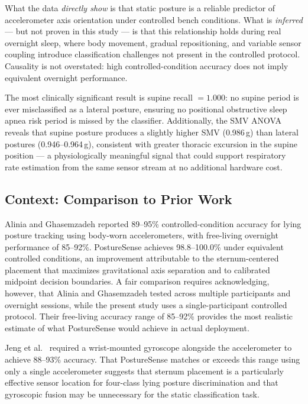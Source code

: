 \documentclass[conference]{IEEEtran}
\begin{document}
What the data \textit{directly show} is that static posture is a reliable predictor
of accelerometer axis orientation under controlled bench conditions.
What is \textit{inferred} --- but not proven in this study --- is that this
relationship holds during real overnight sleep, where body movement, gradual
repositioning, and variable sensor coupling introduce classification challenges not
present in the controlled protocol.
Causality is not overstated: high controlled-condition accuracy does not imply
equivalent overnight performance.

The most clinically significant result is supine recall $= 1.000$: no supine period
is ever misclassified as a lateral posture, ensuring no positional obstructive sleep
apnea risk period is missed by the classifier.
Additionally, the SMV ANOVA reveals that supine posture produces a slightly higher
SMV (0.986\,g) than lateral postures (0.946--0.964\,g), consistent with greater
thoracic excursion in the supine position --- a physiologically meaningful signal that
could support respiratory rate estimation from the same sensor stream at no additional
hardware cost.

\subsection{Context: Comparison to Prior Work}

Alinia and Ghasemzadeh \cite{alinia2020} reported 89--95\% controlled-condition
accuracy for lying posture tracking using body-worn accelerometers, with free-living
overnight performance of 85--92\%.
PostureSense achieves 98.8--100.0\% under equivalent controlled conditions,
an improvement attributable to the sternum-centered placement that maximizes
gravitational axis separation and to calibrated midpoint decision boundaries.
A fair comparison requires acknowledging, however, that Alinia and Ghasemzadeh tested
across multiple participants and overnight sessions, while the present study uses a
single-participant controlled protocol.
Their free-living accuracy range of 85--92\% provides the most realistic estimate of
what PostureSense would achieve in actual deployment.

Jeng et al.\ \cite{jeng2021} required a wrist-mounted gyroscope alongside the
accelerometer to achieve 88--93\% accuracy.
That PostureSense matches or exceeds this range using only a single accelerometer
suggests that sternum placement is a particularly effective sensor location for
four-class lying posture discrimination and that gyroscopic fusion may be unnecessary
for the static classification task.
\end{document}
